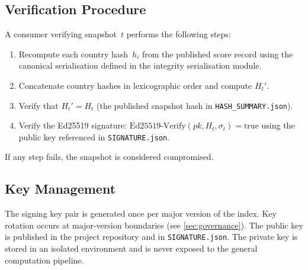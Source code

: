 \subsection{Verification Procedure}\label{sec:integrity:verify}

A consumer verifying snapshot~\(t\) performs the following steps:

\begin{enumerate}
  \item Recompute each country hash~\(h_i\) from the published score record
    using the canonical serialisation defined in the integrity serialisation
    module.
  \item Concatenate country hashes in lexicographic order and compute
    \(H_t'\).
  \item Verify that \(H_t' = H_t\) (the published snapshot hash in
    \texttt{HASH\_SUMMARY.json}).
  \item Verify the Ed25519 signature:
    \(\mathrm{Ed25519\text{-}Verify}(pk, H_t, \sigma_t) = \text{true}\)
    using the public key referenced in \texttt{SIGNATURE.json}.
\end{enumerate}

If any step fails, the snapshot is considered compromised.

\subsection{Key Management}\label{sec:integrity:keys}

The signing key pair is generated once per major version of the index.  Key
rotation occurs at major-version boundaries (see \cref{sec:governance}).  The
public key is published in the project repository and in
\texttt{SIGNATURE.json}.  The private key is stored in an isolated
environment and is never exposed to the general computation pipeline.